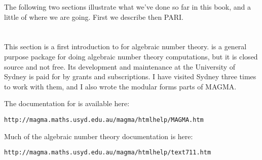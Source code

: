 The following two sections illustrate what we've done so far in this
book, and a little of where we are going.  First we describe
\magma{} then PARI.

\section{\magma{}}
This section is a first introduction to \magma{} for algebraic number
theory.  \magma{} is a general purpose package for doing algebraic
number theory computations, but it is closed source and not free.  Its
development and maintenance at the University of Sydney is paid for by
grants and subscriptions.  I have visited Sydney three times to work
with them, and I also wrote the modular forms parts of MAGMA.

The documentation for \magma{} is available here:
\begin{center}
\verb|http://magma.maths.usyd.edu.au/magma/htmlhelp/MAGMA.htm|
\end{center}
Much of the algebraic number theory documentation is here:
\begin{center}
\verb|http://magma.maths.usyd.edu.au/magma/htmlhelp/text711.htm|
\end{center}

